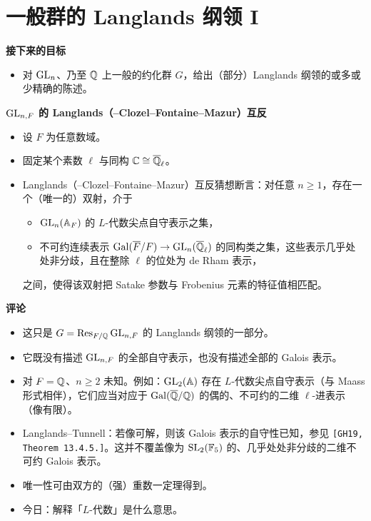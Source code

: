 \chapter{一般群的 Langlands 纲领 I}

\noindent\textbf{接下来的目标}
\begin{itemize}
\item 对 $\operatorname{GL}_n$、乃至 $\mathbb{Q}$ 上一般的约化群 $G$，给出（部分）Langlands 纲领的或多或少精确的陈述。
\end{itemize}

\medskip
\noindent\textbf{$\operatorname{GL}_{n,F}$ 的 Langlands（–Clozel–Fontaine–Mazur）互反}
\begin{itemize}
\item 设 $F$ 为任意数域。
\item 固定某个素数 $\ell$ 与同构 $\mathbb{C}\cong\overline{\mathbb{Q}}_\ell$。
\item Langlands（–Clozel–Fontaine–Mazur）互反猜想断言：对任意 $n\ge1$，存在一个（唯一的）双射，介于
\begin{itemize}
\item[(i)] $\operatorname{GL}_n(\mathbb{A}_F)$ 的 $L$-代数尖点自守表示之集，
\item[(ii)] 不可约连续表示 $\operatorname{Gal}(\overline F/F)\to\operatorname{GL}_n(\overline{\mathbb{Q}}_\ell)$ 的同构类之集，这些表示几乎处处非分歧，且在整除 $\ell$ 的位处为 de Rham 表示，
\end{itemize}
之间，使得该双射把 Satake 参数与 Frobenius 元素的特征值相匹配。
\end{itemize}

\medskip
\noindent\textbf{评论}
\begin{itemize}
\item 这只是 $G=\operatorname{Res}_{F/\mathbb{Q}}\operatorname{GL}_{n,F}$ 的 Langlands 纲领的一部分。
\item 它既没有描述 $\operatorname{GL}_{n,F}$ 的全部自守表示，也没有描述全部的 Galois 表示。
\item 对 $F=\mathbb{Q}$、$n\ge2$ 未知。例如：$\operatorname{GL}_2(\mathbb{A})$ 存在 $L$-代数尖点自守表示（与 Maass 形式相伴），它们应当对应于 $\operatorname{Gal}(\overline{\mathbb{Q}}/\mathbb{Q})$ 的偶的、不可约的二维 $\ell$-进表示（像有限）。
\item Langlands–Tunnell：若像可解，则该 Galois 表示的自守性已知，参见 \texttt{[GH19, Theorem 13.4.5.]}。这并不覆盖像为 $\operatorname{SL}_2(\mathbb{F}_5)$ 的、几乎处处非分歧的二维不可约 Galois 表示。
\item 唯一性可由双方的（强）重数一定理得到。
\item 今日：解释「$L$-代数」是什么意思。
\end{itemize}

